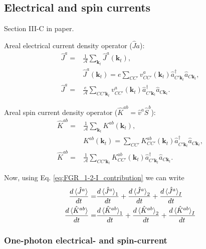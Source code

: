 \documentclass{article}
\newcommand{\kt}{\mathbf{k}_{t}}
\begin{document}
\subsection{Electrical and spin currents}
{\small Section III-C in paper. \\}

Areal electrical current density operator ($\hat{J}{a}$):
\begin{equation}
\begin{split}
\hat{J}^{a} =& \frac{1}{\mathcal{A}} \sum_{\kt} \hat{J}^{a}(\kt) , \\
& \hat{J}^{a}(\kt) = e \sum_{CC'} v^{a}_{CC'}(\kt) \hat{a}^{\dag}_{C'\kt}
\hat{a}_{C\kt} , \\
\hat{J}^{a} =& \frac{e}{\mathcal{A}} \sum_{CC'\kt} v^{a}_{CC'}(\kt) 
\hat{a}^{\dag}_{C'\kt}\hat{a}_{C\kt} .
\end{split}
\end{equation}


Areal spin current density operator ($\hat{K}^{ab}=\hat{v}^{a}\hat{S}^{b}$): 
\begin{equation}
\begin{split}
\hat{K}^{ab} =& \frac{1}{\mathcal{A}} \sum_{\kt} K^{ab}(\kt) , \\
& K^{ab}(\kt) = \sum_{CC'} K^{ab}_{CC'}(\kt)\hat{a}^{\dag}_{C'\kt} 
\hat{a}_{C\kt} , \\
\hat{K}^{ab} =& \frac{1}{\mathcal{A}} \sum_{CC'\kt} K^{ab}_{CC'}(\kt) 
\hat{a}^{\dag}_{C'\kt} \hat{a}_{C\kt} .
\end{split}
\end{equation}

Now, using Eq. \eqref{eq:FGR_1-2-I_contribution} we can write 
\begin{equation*}
\begin{split}
\frac{d\ev*{\hat{J}^{a}}}{dt} =& \frac{d\ev*{\hat{J}^{a}}_{1}}{dt} + 
\frac{d\ev*{\hat{J}^{a}}_{2}}{dt} + \frac{d\ev*{\hat{J}^{a}}_{I}}{dt}  \\
\frac{d\ev*{\hat{K}^{ab}}}{dt} =& \frac{d\ev*{\hat{K}^{ab}}_{1}}{dt} + 
\frac{d\ev*{\hat{K}^{ab}}_{2}}{dt} + \frac{d\ev*{\hat{K}^{ab}}_{I}}{dt}  
\end{split}
\end{equation*}

\subsubsection{One-photon electrical- and spin-current}
\end{document}
